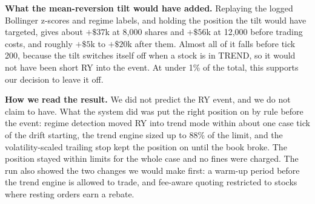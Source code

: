 \documentclass[10pt]{article}
\begin{document}
\textbf{What the mean-reversion tilt would have added.} Replaying the logged Bollinger z-scores and regime labels, and holding the position the tilt would have targeted, gives about $+\$37$k at 8{,}000
shares and $+\$56$k at 12{,}000 before trading costs, and roughly $+\$5$k to $+\$20$k after them. Almost all of it falls before tick 200, because the tilt switches itself off when a stock is in TREND,
so it would not have been short RY into the event. At under 1\% of the total, this supports our decision to leave it off.

\textbf{How we read the result.} We did not predict the RY event, and we do not claim to have. What the system did was put the right position on by rule before the event: regime detection moved RY
into trend mode within about one case tick of the drift starting, the trend engine sized up to 88\% of the limit, and the volatility-scaled trailing stop kept the position on until the book broke.
The position stayed within limits for the whole case and no fines were charged. The run also showed the two changes we would make first: a warm-up period before the trend engine is allowed to trade,
and fee-aware quoting restricted to stocks where resting orders earn a rebate.

\clearpage
\appendix

\end{document}
